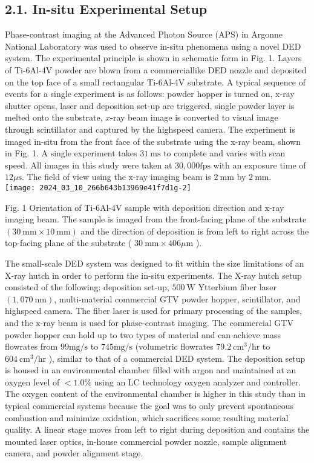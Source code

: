 \documentclass[10pt]{article}
\begin{document}
\subsection*{2.1. In-situ Experimental Setup}
Phase-contrast imaging at the Advanced Photon Source (APS) in Argonne National Laboratory was used to observe in-situ phenomena using a novel DED system. The experimental principle is shown in schematic form in Fig. 1. Layers of Ti-6Al-4V powder are blown from a commerciallike DED nozzle and deposited on the top face of a small rectangular Ti-6Al-4V substrate. A typical sequence of events for a single experiment is as follows: powder hopper is turned on, $\mathrm{x}$-ray shutter opens, laser and deposition set-up are triggered, single powder layer is melted onto the substrate, $x$-ray beam image is converted to visual image through scintillator and captured by the highspeed camera. The experiment is imaged in-situ from the front face of the substrate using the x-ray beam, shown in Fig. 1. A single experiment takes $31 \mathrm{~ms}$ to complete and varies with scan speed. All images in this study were taken at $30,000 \mathrm{fps}$ with an exposure time of $12 \mu \mathrm{s}$. The field of view using the $\mathrm{x}$-ray imaging beam is $2 \mathrm{~mm}$ by $2 \mathrm{~mm}$.\\
\texttt{[image: 2024\_03\_10\_266b643b13969e41f7d1g-2]}

Fig. 1 Orientation of Ti-6Al-4V sample with deposition direction and $\mathrm{x}$-ray imaging beam. The sample is imaged from the front-facing plane of the substrate $(30 \mathrm{~mm} \times 10 \mathrm{~mm})$ and the direction of deposition is from left to right across the top-facing plane of the substrate ( $30 \mathrm{~mm} \times 406 \mu \mathrm{m}$ ).

The small-scale DED system was designed to fit within the size limitations of an X-ray hutch in order to perform the in-situ experiments. The X-ray hutch setup consisted of the following: deposition set-up, $500 \mathrm{~W}$ Ytterbium fiber laser $(1,070 \mathrm{~nm})$, multi-material commercial GTV powder hopper, scintillator, and highspeed camera. The fiber laser is used for primary processing of the samples, and the $\mathrm{x}$-ray beam is used for phase-contrast imaging. The commercial GTV powder hopper can hold up to two types of material and can achieve mass flowrates from $99 \mathrm{mg} / \mathrm{s}$ to $745 \mathrm{mg} / \mathrm{s}$ (volumetric flowrates $79.2 \mathrm{~cm}^{3} / \mathrm{hr}$ to $604 \mathrm{~cm}^{3} / \mathrm{hr}$ ), similar to that of a commercial DED system. The deposition setup is housed in an environmental chamber filled with argon and maintained at an oxygen level of $<1.0 \%$ using an LC technology oxygen analyzer and controller. The oxygen content of the environmental chamber is higher in this study than in typical commercial systems because the goal was to only prevent spontaneous combustion and minimize oxidation, which sacrifices some resulting material quality. A linear stage moves from left to right during deposition and contains the mounted laser optics, in-house commercial powder nozzle, sample alignment camera, and powder alignment stage.
\end{document}
